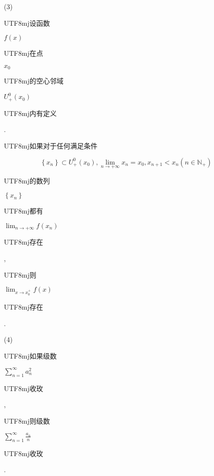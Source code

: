 \documentclass[10pt]{article}
\begin{document}
(3) \begin{CJK}{UTF8}{mj}设函数\end{CJK} $f(x)$ \begin{CJK}{UTF8}{mj}在点\end{CJK} $x_{0}$ \begin{CJK}{UTF8}{mj}的空心邻域\end{CJK} $U_{+}^{0}\left(x_{0}\right)$ \begin{CJK}{UTF8}{mj}内有定义\end{CJK}. \begin{CJK}{UTF8}{mj}如果对于任何满足条件\end{CJK}
$$
\left\{x_{n}\right\} \subset U_{+}^{0}\left(x_{0}\right), \lim _{n \rightarrow+\infty} x_{n}=x_{0}, x_{n+1}<x_{n}\left(n \in \mathbb{N}_{+}\right)
$$
\begin{CJK}{UTF8}{mj}的数列\end{CJK} $\left\{x_{n}\right\}$ \begin{CJK}{UTF8}{mj}都有\end{CJK} $\lim _{n \rightarrow+\infty} f\left(x_{n}\right)$ \begin{CJK}{UTF8}{mj}存在\end{CJK}, \begin{CJK}{UTF8}{mj}则\end{CJK} $\lim _{x \rightarrow x_{0}^{+}} f(x)$ \begin{CJK}{UTF8}{mj}存在\end{CJK}.

(4) \begin{CJK}{UTF8}{mj}如果级数\end{CJK} $\sum_{n=1}^{\infty} a_{n}^{2}$ \begin{CJK}{UTF8}{mj}收玫\end{CJK}, \begin{CJK}{UTF8}{mj}则级数\end{CJK} $\sum_{n=1}^{\infty} \frac{a_{n}}{n}$ \begin{CJK}{UTF8}{mj}收玫\end{CJK}.
\end{document}
